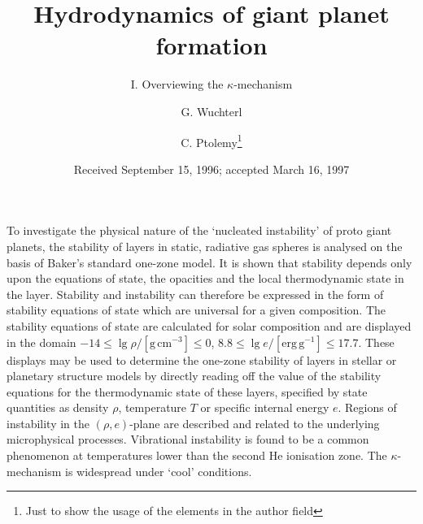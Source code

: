 \documentclass{aa}
\begin{document}
 


   \title{Hydrodynamics of giant planet formation}

   \subtitle{I. Overviewing the $\kappa$-mechanism}

   \author{G. Wuchterl
          \and
          C. Ptolemy\fnmsep\thanks{Just to show the usage
          of the elements in the author field}
          }


   \date{Received September 15, 1996; accepted March 16, 1997}

 
  \abstract
   {To investigate the physical nature of the `nuc\-leated instability' of
   proto giant planets, the stability of layers
   in static, radiative gas spheres is analysed on the basis of Baker's
   standard one-zone model.}
   {It is shown that stability
   depends only upon the equations of state, the opacities and the local
   thermodynamic state in the layer. Stability and instability can
   therefore be expressed in the form of stability equations of state
   which are universal for a given composition.}
   {The stability equations of state are
   calculated for solar composition and are displayed in the domain
   $-14 \leq \lg \rho / \mathrm{[g\, cm^{-3}]} \leq 0 $,
   $ 8.8 \leq \lg e / \mathrm{[erg\, g^{-1}]} \leq 17.7$. These displays
   may be
   used to determine the one-zone stability of layers in stellar
   or planetary structure models by directly reading off the value of
   the stability equations for the thermodynamic state of these layers,
   specified
   by state quantities as density $\rho$, temperature $T$ or
   specific internal energy $e$.
   Regions of instability in the $(\rho,e)$-plane are described
   and related to the underlying microphysical processes.}
   {Vibrational instability is found to be a common phenomenon
   at temperatures lower than the second He ionisation
   zone. The $\kappa$-mechanism is widespread under `cool'
   conditions.}
   {}
\end{document}
